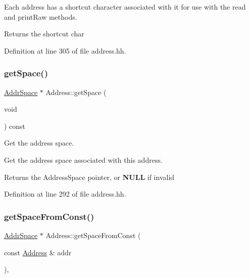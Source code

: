 Each address has a shortcut character associated with it for use with the read and print\+Raw methods. \begin{DoxyReturn}{Returns}
the shortcut char 
\end{DoxyReturn}


Definition at line 305 of file address.\+hh.

\mbox{\label{class_address_a2e1cbf153126eebf5ba92f52c5dbc6a8}} 
\subsubsection{\texorpdfstring{getSpace()}{getSpace()}}
{\footnotesize\ttfamily \mbox{\hyperlink{class_addr_space}{Addr\+Space}} $\ast$ Address\+::get\+Space (\begin{DoxyParamCaption}\item[{void}]{ }\end{DoxyParamCaption}) const\hspace{0.3cm}{\ttfamily [inline]}}



Get the address space. 

Get the address space associated with this address. \begin{DoxyReturn}{Returns}
the Address\+Space pointer, or {\bfseries{N\+U\+LL}} if invalid 
\end{DoxyReturn}


Definition at line 292 of file address.\+hh.

\mbox{\label{class_address_acd17db20230415cb1fe1ad33c34c11ff}} 
\subsubsection{\texorpdfstring{getSpaceFromConst()}{getSpaceFromConst()}}
{\footnotesize\ttfamily \mbox{\hyperlink{class_addr_space}{Addr\+Space}} $\ast$ Address\+::get\+Space\+From\+Const (\begin{DoxyParamCaption}\item[{const \mbox{\hyperlink{class_address}{Address}} \&}]{addr }\end{DoxyParamCaption})\hspace{0.3cm}{\ttfamily [inline]}, {\ttfamily [static]}}



